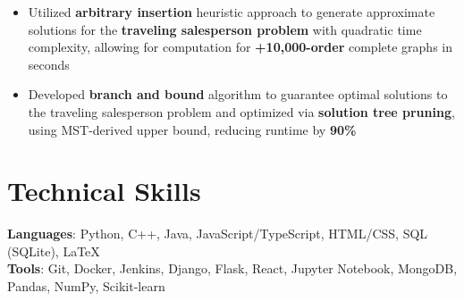 \documentclass[letterpaper,11pt]{article}
\begin{document}
\begin{itemize}
    \item Utilized \textbf{arbitrary insertion} heuristic approach to generate
          approximate solutions for the \textbf{traveling salesperson problem} with
          quadratic time complexity, allowing for computation for \textbf{+10,000-order}
          complete graphs in seconds
    \item Developed \textbf{branch and bound} algorithm to guarantee optimal solutions to
          the traveling salesperson problem and optimized via \textbf{solution tree
              pruning}, using MST-derived upper bound, reducing runtime by \textbf{90\%}
\end{itemize}
\section{Technical Skills}
\textbf{Languages}: Python, C++, Java, JavaScript/TypeScript, HTML/CSS,
SQL (SQLite), \LaTeX \\
\textbf{Tools}: Git, Docker, Jenkins, Django, Flask, React,
Jupyter Notebook, MongoDB, Pandas, NumPy, Scikit-learn
\end{document}
